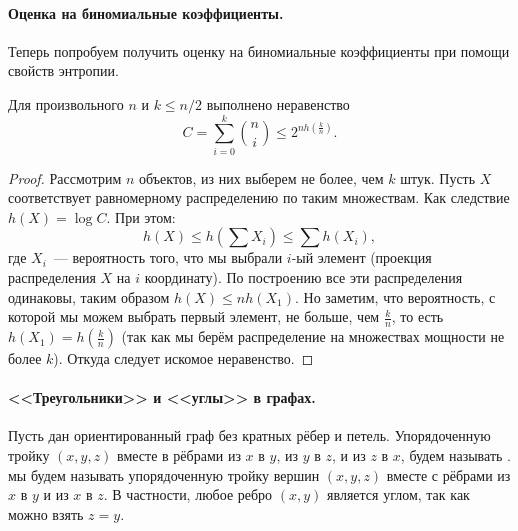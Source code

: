 \paragraph{Оценка на биномиальные коэффициенты.}
Теперь попробуем получить оценку на биномиальные коэффициенты при помощи свойств энтропии.

\begin{proposition}
    \label{prop:binomial-coef}
	Для произвольного $n$ и $k \le n / 2$ выполнено неравенство
    $$
        C = \sum_{i = 0}^k \binom{n}{i} \le 2^{nh\left(\frac{k}{n}\right)}.
    $$
\end{proposition}

\begin{proof}
    Рассмотрим $n$ объектов, из них выберем не более, чем $k$ штук. Пусть $X$ соответствует равномерному
    распределению по таким множествам. Как следствие $h(X) = \log C$. При этом:
    $$
        h(X) \le h\left(\sum X_i\right) \le \sum h(X_i),
    $$
    где $X_i$~--- вероятность того, что мы выбрали $i$-ый элемент (проекция распределения $X$ на $i$
    координату). По построению все эти распределения одинаковы, таким образом $h(X) \le nh(X_1)$. Но
    заметим, что вероятность, с которой мы можем выбрать первый элемент, не больше, чем $\frac{k}{n}$, то
    есть $h(X_1) = h\left(\frac{k}{n}\right)$ (так как мы берём распределение на множествах мощности не
    более $k$). Откуда следует искомое неравенство.
\end{proof}


\paragraph{<<Треугольники>> и <<углы>> в графах.}
Пусть дан ориентированный граф без кратных рёбер и петель. Упорядоченную тройку $(x, y, z)$ вместе в
рёбрами из $x$ в $y$, из $y$ в $z$, и из $z$ в $x$, будем называть
.  мы будем называть упорядоченную тройку вершин $(x, y, z)$ вместе
с рёбрами из $x$ в $y$ и из $x$ в $z$. В частности, любое ребро $(x, y)$ является углом, так как можно
взять $z = y$.

